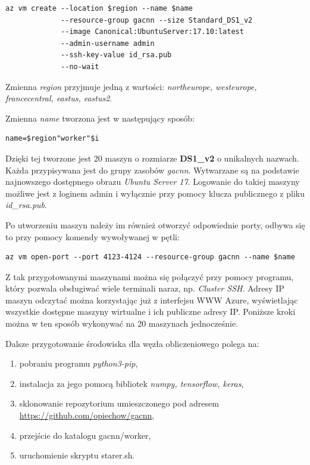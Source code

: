 \begin{lstlisting}
az vm create --location $region --name $name
             --resource-group gacnn --size Standard_DS1_v2
             --image Canonical:UbuntuServer:17.10:latest
             --admin-username admin
             --ssh-key-value id_rsa.pub
             --no-wait
\end{lstlisting}

Zmienna \textit{region} przyjmuje jedną z wartości: \textit{northeurope, westeurope, francecentral, eastus, eastus2}.

Zmienna \textit{name} tworzona jest w następujący sposób:

\begin{lstlisting}
name=$region"worker"$i
\end{lstlisting}

Dzięki tej tworzone jest 20 maszyn o rozmiarze \textbf{DS1\_v2} o unikalnych nazwach.
Każda przypisywana jest do grupy zasobów \textit{gacnn}.
Wytwarzane są na podstawie najnowszego dostępnego obrazu \textit{Ubuntu Server 17}.
Logowanie do takiej maszyny możliwe jest z loginem admin i wyłącznie przy pomocy klucza publicznego z pliku \textit{id\_rsa.pub}.

Po utworzeniu maszyn należy im również otworzyć odpowiednie porty, odbywa się to przy pomocy komendy wywoływanej w pętli:
\begin{lstlisting}
az vm open-port --port 4123-4124 --resource-group gacnn --name $name
\end{lstlisting}

Z tak przygotowanymi maszynami można się połączyć przy pomocy programu, który pozwala obsługiwać wiele terminali naraz, np. \textit{Cluster SSH}.
Adresy IP maszyn odczytać można korzystając już z interfejsu WWW Azure, wyświetlając wszystkie dostępne maszyny wirtualne i ich publiczne adresy IP.
Poniższe kroki można w ten sposób wykonywać na 20 maszynach jednocześnie.

Dalsze przygotowanie środowiska dla węzła obliczeniowego polega na:
\begin{enumerate}
  \item pobraniu programu \textit{python3-pip},
  \item instalacja za jego pomocą bibliotek \textit{numpy, tensorflow, keras},
  \item sklonowanie repozytorium umieszczonego pod adresem \url{https://github.com/opiechow/gacnn},
  \item przejście do katalogu gacnn/worker,
  \item uruchomienie skryptu starer.sh.
\end{enumerate}

